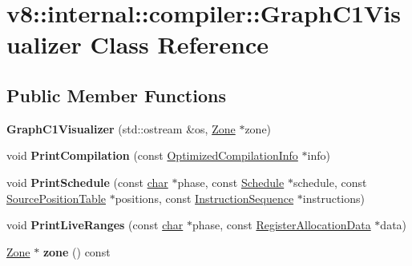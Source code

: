\hypertarget{classv8_1_1internal_1_1compiler_1_1GraphC1Visualizer}{}\section{v8\+:\+:internal\+:\+:compiler\+:\+:Graph\+C1\+Visualizer Class Reference}
\label{classv8_1_1internal_1_1compiler_1_1GraphC1Visualizer}
\subsection*{Public Member Functions}
\begin{DoxyCompactItemize}
\item 
\mbox{\label{classv8_1_1internal_1_1compiler_1_1GraphC1Visualizer_a60c8399fb60170f273da9f7b92f6294a}} 
{\bfseries Graph\+C1\+Visualizer} (std\+::ostream \&os, \mbox{\hyperlink{classv8_1_1internal_1_1Zone}{Zone}} $\ast$zone)
\item 
\mbox{\label{classv8_1_1internal_1_1compiler_1_1GraphC1Visualizer_a26d2ddfa0795e9ed10283d6a47aaee90}} 
void {\bfseries Print\+Compilation} (const \mbox{\hyperlink{classv8_1_1internal_1_1OptimizedCompilationInfo}{Optimized\+Compilation\+Info}} $\ast$info)
\item 
\mbox{\label{classv8_1_1internal_1_1compiler_1_1GraphC1Visualizer_a3284f03562859b8e7452ad822ecc9ae4}} 
void {\bfseries Print\+Schedule} (const \mbox{\hyperlink{classchar}{char}} $\ast$phase, const \mbox{\hyperlink{classv8_1_1internal_1_1compiler_1_1Schedule}{Schedule}} $\ast$schedule, const \mbox{\hyperlink{classv8_1_1internal_1_1compiler_1_1SourcePositionTable}{Source\+Position\+Table}} $\ast$positions, const \mbox{\hyperlink{classv8_1_1internal_1_1compiler_1_1InstructionSequence}{Instruction\+Sequence}} $\ast$instructions)
\item 
\mbox{\label{classv8_1_1internal_1_1compiler_1_1GraphC1Visualizer_a52057023036222084e4fa0036486b0ad}} 
void {\bfseries Print\+Live\+Ranges} (const \mbox{\hyperlink{classchar}{char}} $\ast$phase, const \mbox{\hyperlink{classv8_1_1internal_1_1compiler_1_1RegisterAllocationData}{Register\+Allocation\+Data}} $\ast$data)
\item 
\mbox{\label{classv8_1_1internal_1_1compiler_1_1GraphC1Visualizer_aa5f318dc84d1052c63774076b026b506}} 
\mbox{\hyperlink{classv8_1_1internal_1_1Zone}{Zone}} $\ast$ {\bfseries zone} () const
\end{DoxyCompactItemize}



